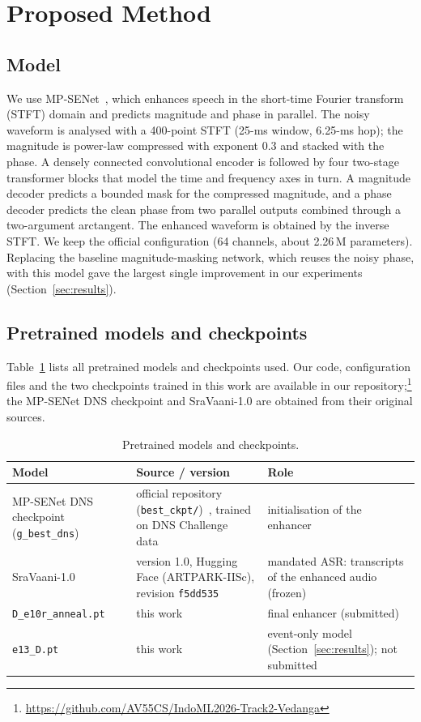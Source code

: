 \documentclass[conference]{IEEEtran}
\begin{document}
\section{Proposed Method}\label{sec:method}
\subsection{Model}
We use MP-SENet~\cite{lu2023mp}, which enhances speech in the short-time Fourier transform (STFT) domain and predicts magnitude and phase in parallel. The noisy waveform is analysed with a 400-point STFT (25-ms window, 6.25-ms hop); the magnitude is power-law compressed with exponent 0.3 and stacked with the phase. A densely connected convolutional encoder is followed by four two-stage transformer blocks that model the time and frequency axes in turn. A magnitude decoder predicts a bounded mask for the compressed magnitude, and a phase decoder predicts the clean phase from two parallel outputs combined through a two-argument arctangent. The enhanced waveform is obtained by the inverse STFT. We keep the official configuration (64 channels, about 2.26\,M parameters). Replacing the baseline magnitude-masking network, which reuses the noisy phase, with this model gave the largest single improvement in our experiments (Section~\ref{sec:results}).

\subsection{Pretrained models and checkpoints}
Table~\ref{tab:models} lists all pretrained models and checkpoints used. Our code, configuration files and the two checkpoints trained in this work are available in our repository;\footnote{\url{https://github.com/AV55CS/IndoML2026-Track2-Vedanga}} the MP-SENet DNS checkpoint and SraVaani-1.0 are obtained from their original sources.

\begin{table}[t]\centering\caption{Pretrained models and checkpoints.}\label{tab:models}\footnotesize\setlength{\tabcolsep}{2.5pt}
\begin{tabular}{>{\raggedright\arraybackslash}p{2.6cm}>{\raggedright\arraybackslash}p{2.75cm}>{\raggedright\arraybackslash}p{2.4cm}}\toprule
Model & Source / version & Role\\\midrule
MP-SENet DNS checkpoint (\texttt{g\_best\_dns}) & official repository (\texttt{best\_ckpt/})~\cite{lu2023mp}, trained on DNS Challenge data~\cite{reddy2020interspeech} & initialisation of the enhancer\\
SraVaani-1.0~\cite{pulikodan2026sravaani} & version 1.0, Hugging Face (ARTPARK-IISc), revision \texttt{f5dd535} & mandated ASR: transcripts of the enhanced audio (frozen)\\
\texttt{D\_e10r\_anneal.pt} & this work & final enhancer (submitted)\\
\texttt{e13\_D.pt} & this work & event-only model (Section~\ref{sec:results}); not submitted\\\bottomrule
\end{tabular}\end{table}
\end{document}
